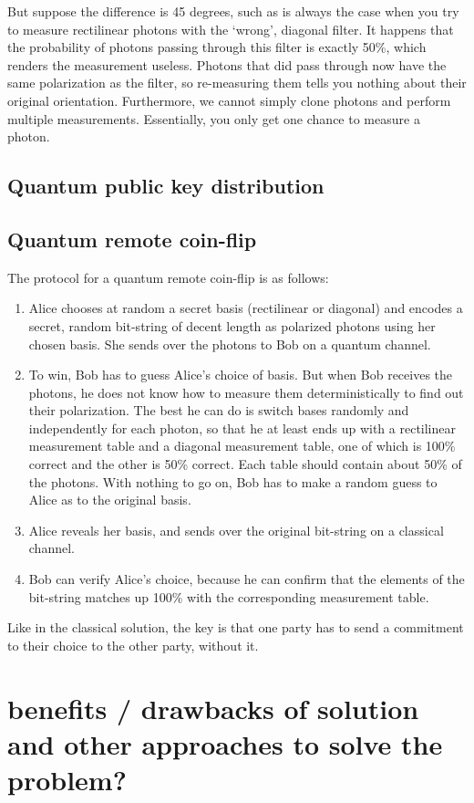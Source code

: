 \documentclass[oneside,a4paper]{article}
\begin{document}
But suppose the difference is 45 degrees, such as is always the case when you try to measure rectilinear photons with the `wrong', diagonal filter. 
It happens that the probability of photons passing through this filter is exactly 50\%, which renders the measurement useless.
Photons that did pass through now have the same polarization as the filter, so re-measuring them tells you nothing about their original orientation.
Furthermore, we cannot simply clone photons and perform multiple measurements.
Essentially, you only get one chance to measure a photon.


\subsection{Quantum public key distribution}


\subsection{Quantum remote coin-flip}
The protocol for a quantum remote coin-flip is as follows:
\begin{enumerate}
	\item
		Alice chooses at random a secret basis (rectilinear or diagonal) and encodes a secret, random bit-string of decent length as polarized photons using her chosen basis.
		She sends over the photons to Bob on a quantum channel.
	\item 
		To win, Bob has to guess Alice's choice of basis.
		But when Bob receives the photons, he does not know how to measure them deterministically to find out their polarization.
		The best he can do is switch bases randomly and independently for each photon, so that he at least ends up with a rectilinear measurement table and a diagonal measurement table, one of which is 100\% correct and the other is 50\% correct.
		Each table should contain about 50\% of the photons.
		With nothing to go on, Bob has to make a random guess to Alice as to the original basis.
	\item Alice reveals her basis, and sends over the original bit-string on a classical channel.
	\item Bob can verify Alice's choice, because he can confirm that the elements of the bit-string matches up 100\% with the corresponding measurement table.
\end{enumerate}

Like in the classical solution, the key is that one party has to send a commitment to their choice to the other party, without it.





\section{benefits / drawbacks of solution  and other approaches to solve the problem?}




\end{document}
